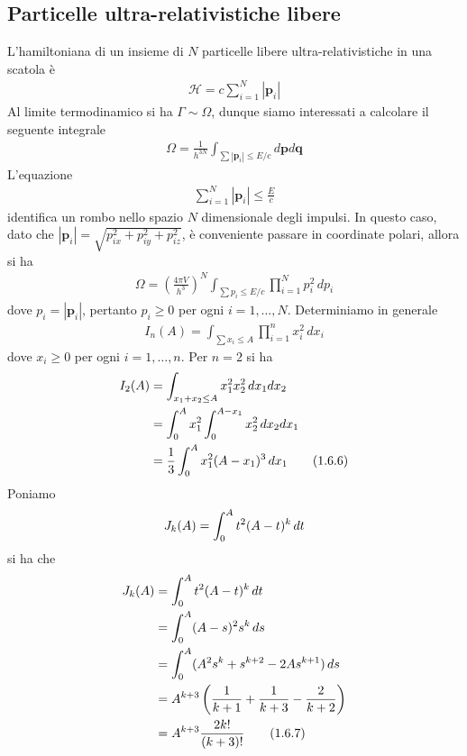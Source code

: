 \documentclass{article}
\begin{document}
\subsection{Particelle ultra-relativistiche libere}
L'hamiltoniana di un insieme di $N$ particelle libere ultra-relativistiche in una scatola è
\begin{align}
    \mathcal{H} = c\sum_{i = 1}^N |\mathbf{p}_i| \tag{1.6.1}
\end{align}
Al limite termodinamico si ha $\Gamma \sim \Omega$, dunque siamo interessati a calcolare il seguente integrale
\begin{align}
    \Omega = \frac{1}{h^{3N}}\int_{\sum |\mathbf{p}_i| \leq E/c} d\mathbf{p}d\mathbf{q} \tag{1.6.2}
\end{align}
L'equazione
\begin{align}
    \sum_{i = 1}^N|\mathbf{p}_i| \leq \frac{E}{c} \tag{1.6.3}
\end{align}
identifica un rombo nello spazio $N$ dimensionale degli impulsi. In questo caso, dato che $|\mathbf{p}_i| = \sqrt{p^2_{ix} + p^2_{iy} + p^2_{iz}}$, è conveniente passare in coordinate polari, allora si ha
\begin{align}
    \Omega = \left(\frac{4\pi V}{h^3}\right)^N \int_{\sum p_i \leq E/c} \prod_{i = 1}^N p^2_i \, dp_i \tag{1.6.4}
\end{align}
dove $p_i = |\mathbf{p}_i|$, pertanto $p_i \geq 0$ per ogni $i = 1, \dots, N$. Determiniamo in generale
\begin{align}
    I_n(A) = \int_{\sum x_i \leq A}\prod_{i = 1}^nx^2_i \, dx_i \tag{1.6.5}
\end{align}
dove $x_i \geq 0$ per ogni $i = 1, \dots, n$. Per $n = 2$ si ha
\begin{align}
    I_2(A) &= \int_{x_1 + x_2 \leq A}x^2_1x^2_2 \, dx_1dx_2 \notag \\
    &= \int_0^A x^2_1 \int_0^{A - x_1} x^2_2 \, dx_2dx_1 \notag \\
    &= \frac{1}{3}\int_0^A x^2_1(A - x_1)^3 \, dx_1 \tag{1.6.6}
\end{align}
Poniamo
\begin{align}
    J_k(A) = \int_0^A t^2(A - t)^k \, dt \notag
\end{align}
si ha che
\begin{align}
    J_k(A) &= \int_0^A t^2(A - t)^k \, dt \notag \\
    &= \int_0^A (A - s)^2s^k \, ds \notag \\
    &= \int_0^A (A^2s^k + s^{k + 2} - 2As^{k + 1}) \, ds \notag \\
    &= A^{k + 3}\left(\frac{1}{k + 1} + \frac{1}{k + 3} - \frac{2}{k + 2}\right) \notag \\
    &= A^{k + 3}\frac{2k!}{(k + 3)!} \tag{1.6.7}
\end{align}
\end{document}
